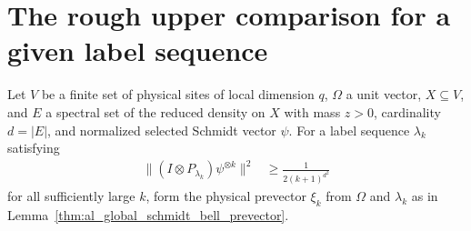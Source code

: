 \section{The rough upper comparison for a given label sequence}

\begin{lemma}
    \label{thm:al_global_schmidt_bell_rough_upper}
    \leanok
    Let $V$ be a finite set of physical sites of local dimension $q$,
    $\Omega$ a unit vector, $X\subseteq V$, and $E$ a spectral set of the
    reduced density on $X$ with mass $z>0$, cardinality $d=|E|$, and normalized
    selected Schmidt vector $\psi$. For a label sequence $\lambda_k$ satisfying
    \begin{align}
        \|(I\otimes P_{\lambda_k})\psi^{\otimes k}\|^2
         & \geq\frac{1}{2(k+1)^{d^2}}
        \label{eq:al_rough_upper_label_mass}
    \end{align}
    for all sufficiently large $k$, form the physical prevector $\xi_k$ from
    $\Omega$ and $\lambda_k$ as in
    Lemma~\ref{thm:al_global_schmidt_bell_prevector}.


\end{lemma}
